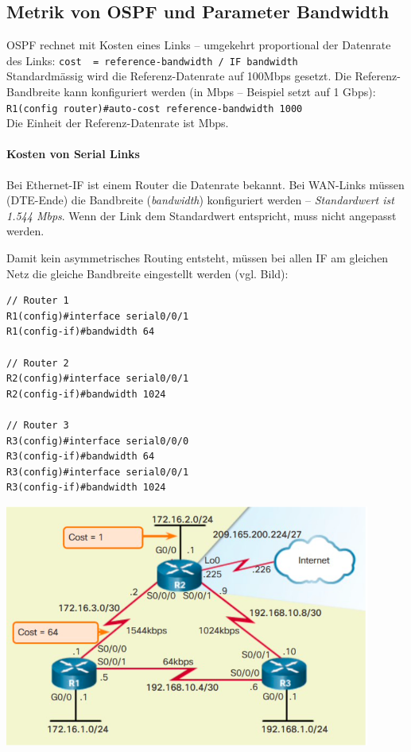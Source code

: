 \documentclass[a4paper,12pt]{article}
\begin{document}
\subsection{Metrik von OSPF und Parameter Bandwidth}
OSPF rechnet mit Kosten eines Links -- umgekehrt proportional der Datenrate des Links: \verb+cost  = reference-bandwidth / IF bandwidth+\\

Standardmässig wird die Referenz-Datenrate auf 100Mbps gesetzt. Die Referenz-Bandbreite kann konfiguriert werden (in Mbps -- Beispiel setzt auf 1 Gbps): \verb+R1(config router)#auto-cost reference-bandwidth 1000+\\
Die Einheit der Referenz-Datenrate ist Mbps.


\paragraph{Kosten von Serial Links}
Bei Ethernet-IF ist einem Router die Datenrate bekannt. Bei WAN-Links müssen (DTE-Ende) die Bandbreite (\emph{bandwidth}) konfiguriert werden -- \emph{Standardwert ist 1.544 Mbps}. Wenn der Link dem Standardwert entspricht, muss nicht angepasst werden.

Damit kein asymmetrisches Routing entsteht, müssen bei allen IF am gleichen Netz die gleiche Bandbreite eingestellt werden (vgl. Bild):
\begin{lstlisting}
// Router 1
R1(config)#interface serial0/0/1
R1(config-if)#bandwidth 64

// Router 2
R2(config)#interface serial0/0/1
R2(config-if)#bandwidth 1024

// Router 3
R3(config)#interface serial0/0/0
R3(config-if)#bandwidth 64
R3(config)#interface serial0/0/1
R3(config-if)#bandwidth 1024
\end{lstlisting}

\begin{center}
\includegraphics[width=12cm]{img/14_cost.png}
\end{center}
\end{document}
